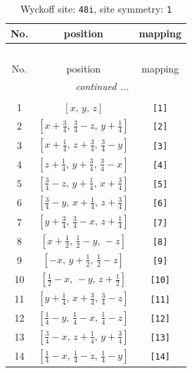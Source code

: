 \documentclass[fleqn,8pt]{jsarticle}
\begin{document}
\begin{longtable}{ccc}
\caption{Wyckoff site: {\tt 48i}, site symmetry: {\tt 1}}
 \\
 \hline \hline
No. & position & mapping \\ \hline \endfirsthead

\multicolumn{2}{l}{\tablename\ \thetable{}} \\
 \hline \hline
No. & position & mapping \\ \hline \endhead

 \hline \hline
\multicolumn{2}{r}{\footnotesize\it continued ...} \\ \endfoot

 \hline \hline
\multicolumn{2}{r}{} \\ \endlastfoot

1 & $\left[ x,\, y,\, z \right]$ & {\tt [1]} \\ \hline
2 & $\left[ x + \frac{3}{4},\, \frac{3}{4} - z,\, y + \frac{1}{4} \right]$ & {\tt [2]} \\ \hline
3 & $\left[ x + \frac{1}{4},\, z + \frac{3}{4},\, \frac{3}{4} - y \right]$ & {\tt [3]} \\ \hline
4 & $\left[ z + \frac{1}{4},\, y + \frac{3}{4},\, \frac{3}{4} - x \right]$ & {\tt [4]} \\ \hline
5 & $\left[ \frac{3}{4} - z,\, y + \frac{1}{4},\, x + \frac{3}{4} \right]$ & {\tt [5]} \\ \hline
6 & $\left[ \frac{3}{4} - y,\, x + \frac{1}{4},\, z + \frac{3}{4} \right]$ & {\tt [6]} \\ \hline
7 & $\left[ y + \frac{3}{4},\, \frac{3}{4} - x,\, z + \frac{1}{4} \right]$ & {\tt [7]} \\ \hline
8 & $\left[ x + \frac{1}{2},\, \frac{1}{2} - y,\, - z \right]$ & {\tt [8]} \\ \hline
9 & $\left[ - x,\, y + \frac{1}{2},\, \frac{1}{2} - z \right]$ & {\tt [9]} \\ \hline
10 & $\left[ \frac{1}{2} - x,\, - y,\, z + \frac{1}{2} \right]$ & {\tt [10]} \\ \hline
11 & $\left[ y + \frac{1}{4},\, x + \frac{3}{4},\, \frac{3}{4} - z \right]$ & {\tt [11]} \\ \hline
12 & $\left[ \frac{1}{4} - y,\, \frac{1}{4} - x,\, \frac{1}{4} - z \right]$ & {\tt [12]} \\ \hline
13 & $\left[ \frac{3}{4} - x,\, z + \frac{1}{4},\, y + \frac{3}{4} \right]$ & {\tt [13]} \\ \hline
14 & $\left[ \frac{1}{4} - x,\, \frac{1}{4} - z,\, \frac{1}{4} - y \right]$ & {\tt [14]} \\ \hline

\end{longtable}
\end{document}
